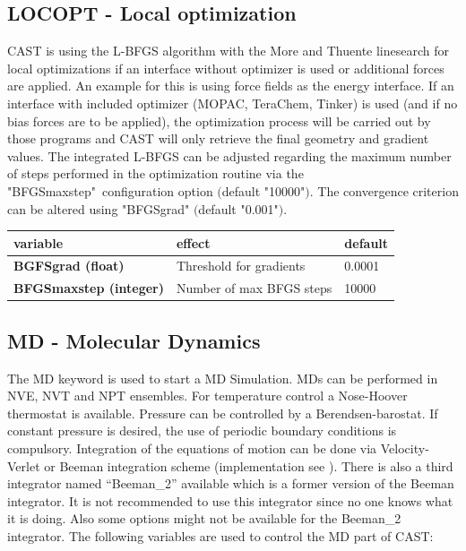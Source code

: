 \documentclass[10pt,a4paper]{article} %
\newif\ifdevmode %
\begin{document}
	\subsection{LOCOPT - Local optimization}
	\label{sec:locopt}
	\ac{CAST} is using the L-BFGS algorithm\supercite{bfgs} with the More and Thuente linesearch\supercite{morethuente} for local optimizations if an interface without optimizer is used or additional forces are applied. An example for this is using force fields as the energy interface. \ifdevmode ~\\ \colorbox{red}{what does additional forces applied mean?} ~\\ \fi
	If an interface with included optimizer (MOPAC, TeraChem, Tinker) is used (and if no bias forces are to be applied), the optimization process will be carried out by those programs and \ac{CAST} will only retrieve the final geometry and gradient values.
	The integrated L-BFGS can be adjusted regarding the maximum number of steps performed in the optimization routine via the "BFGSmaxstep"\ configuration option $($default "10000"$)$.
	The convergence criterion can be altered using "BFGSgrad" $($default "0.001"$)$.

	\begin{tabularx}{\textwidth}{l|l|l}
		variable & effect & default \\
		\hline
		\textbf{BGFSgrad (float)} & Threshold for gradients & 0.0001 \\
		\textbf{BFGSmaxstep (integer)} & Number of max BFGS steps & 10000 \\
	\end{tabularx}

	\subsection{MD - Molecular Dynamics}
	The MD keyword is used to start a \acf{MD} Simulation\supercite{md_art}. \acp{MD} can be performed in NVE, NVT and NPT ensembles. For temperature control a Nose-Hoover thermostat\supercite{nose,hoover} is available. Pressure can be controlled by a Berendsen-barostat\supercite{berendsen}. If constant pressure is desired, the use of periodic boundary conditions is compulsory. Integration of the equations of motion can be done via Velocity-Verlet or Beeman\supercite{beeman} integration scheme (implementation see \cite{becker_development_2015}). There is also a third integrator named ``Beeman\_2'' available which is a former version of the Beeman integrator. It is not recommended to use this integrator since no one knows what it is doing. Also some options might not be available for the Beeman\_2 integrator.
	The following variables are used to control the \ac{MD} part of \ac{CAST}:\\~\\
\end{document}
